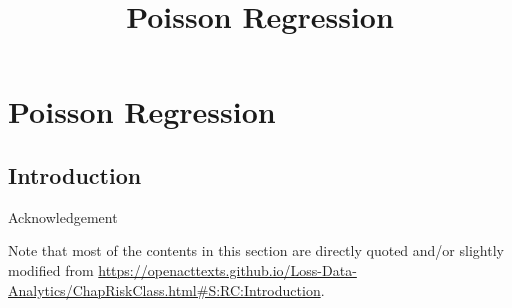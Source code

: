 \documentclass[ignorenonframetext,]{beamer}
\title{Poisson Regression}
\begin{document}
\frame{\titlepage}

\section{Poisson Regression}

\subsection{Introduction}


\begin{frame}{Acknowledgement}

Note that most of the contents in this section are directly quoted and/or slightly modified from 
\url{https://openacttexts.github.io/Loss-Data-Analytics/ChapRiskClass.html\#S:RC:Introduction}.


\end{frame}
\end{document}
